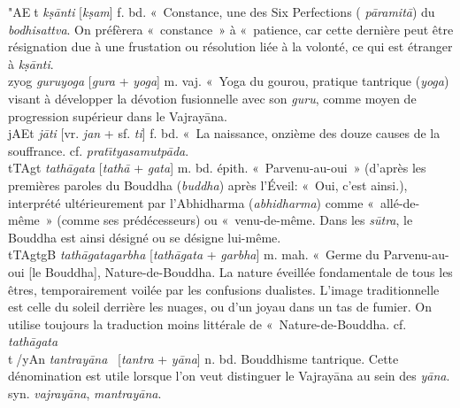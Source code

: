 \documentclass[a4paper,11pt,twocolumn]{article}
\begin{document}
{\dn "AE^^Ft} {\em k\d{s}\={a}nti} [{\em k\d{s}am}]
f. bd. «~Constance\fg, une des Six Perfections ({\em
p\={a}ramit\={a}}) du {\em bodhisattva}. On préfèrera «~constance~» à
«~patience\fg, car cette dernière peut être résignation due à une
frustation ou résolution liée à la volonté, ce qui est étranger à {\em
k\d{s}\={a}nti}. \\

{\dn {}zyog} {\em guruyoga} [{\em gura} + {\em yoga}] m. vaj. «~Yoga
du gourou\fg, pratique tantrique ({\em yoga}) visant à développer la
dévotion fusionnelle avec son {\em guru}, comme moyen de progression
supérieur dans le Vajray\={a}na. \\

{\dn jAEt} {\em j\={a}ti} [vr. {\em jan} + sf. {\em ti}] f. bd. «~La
naissance\fg, onzième des douze causes de la souffrance. cf. {\em
prat\={\i}tyasamutp\={a}da}. \\


{\dn tTAgt} {\em tath\={a}gata} [{\em tath\={a}} + {\em gata}]
m. bd. épith. «~Parvenu-au-oui~» (d'après les premières paroles du Bouddha
({\em buddha}) après l'Éveil: «~Oui, c'est ainsi.\fg), interprété
ultérieurement par l'Abhidharma ({\em abhidharma}) comme
«~allé-de-même~» (comme ses prédécesseurs) ou «~venu-de-même\fg. Dans
les {\em s\={u}tra}, le Bouddha est ainsi désigné ou se désigne
lui-même. \\

{\dn tTAgtgB\0} {\em tath\={a}gatagarbha} [{\em tath\={a}gata} +
{\em garbha}] m. mah. «~Germe du Parvenu-au-oui [le Bouddha],
Nature-de-Bouddha\fg. La nature éveillée fondamentale de tous les
êtres, temporairement voilée par les confusions dualistes. L'image
traditionnelle est celle du soleil derrière les nuages, ou d'un joyau
dans un tas de fumier. On utilise toujours la traduction moins
littérale de «~Nature-de-Bouddha\fg. cf. {\em tath\={a}gata} \\


{\dn t^^F/yAn} {\em tantray\={a}na} \ [{\em tantra} + {\em
y\={a}na}] n. bd. Bouddhisme tantrique. Cette dénomination est utile
lorsque l'on veut distinguer le Vajray\={a}na au sein des {\em
y\={a}na}. syn. {\em vajray\={a}na}, {\em mantray\={a}na}.\\
\end{document}
